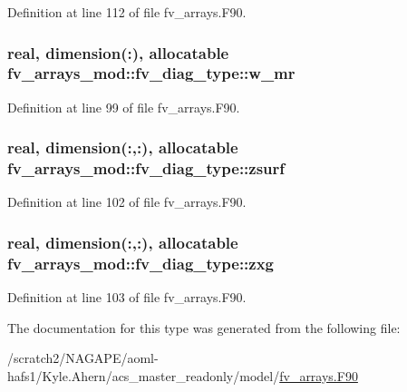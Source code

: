 Definition at line 112 of file fv\-\_\-arrays.\-F90.

\subsubsection[{w\-\_\-mr}]{\setlength{\rightskip}{0pt plus 5cm}real, dimension(\-:), allocatable fv\-\_\-arrays\-\_\-mod\-::fv\-\_\-diag\-\_\-type\-::w\-\_\-mr}\label{structfv__arrays__mod_1_1fv__diag__type_a4d259addb1c6c08c0227fe069d965ea3}


Definition at line 99 of file fv\-\_\-arrays.\-F90.

\subsubsection[{zsurf}]{\setlength{\rightskip}{0pt plus 5cm}real, dimension(\-:,\-:), allocatable fv\-\_\-arrays\-\_\-mod\-::fv\-\_\-diag\-\_\-type\-::zsurf}\label{structfv__arrays__mod_1_1fv__diag__type_af067ded7c9f594b49e5014ccdd8f2ef2}


Definition at line 102 of file fv\-\_\-arrays.\-F90.

\subsubsection[{zxg}]{\setlength{\rightskip}{0pt plus 5cm}real, dimension(\-:,\-:), allocatable fv\-\_\-arrays\-\_\-mod\-::fv\-\_\-diag\-\_\-type\-::zxg}\label{structfv__arrays__mod_1_1fv__diag__type_a52e01f510a1a63071b116fa418a2fe36}


Definition at line 103 of file fv\-\_\-arrays.\-F90.



The documentation for this type was generated from the following file\-:\begin{DoxyCompactItemize}
\item 
/scratch2/\-N\-A\-G\-A\-P\-E/aoml-\/hafs1/\-Kyle.\-Ahern/acs\-\_\-master\-\_\-readonly/model/\hyperlink{fv__arrays_8F90}{fv\-\_\-arrays.\-F90}\end{DoxyCompactItemize}

